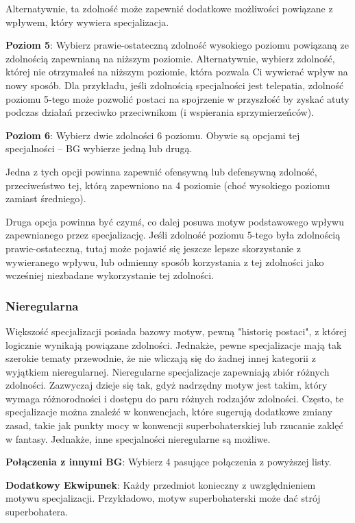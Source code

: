 Alternatywnie, ta zdolność może zapewnić dodatkowe możliwości powiązane z wpływem, który wywiera specjalizacja. 

\textbf{Poziom 5}: Wybierz prawie-ostateczną zdolność wysokiego poziomu powiązaną ze zdolnością zapewnianą na niższym poziomie. Alternatywnie, wybierz zdolność, której nie otrzymałeś na niższym poziomie, która pozwala Ci wywierać wpływ na nowy sposób. Dla przykładu, jeśli zdolnością specjalności jest telepatia, zdolność poziomu 5-tego może pozwolić postaci na spojrzenie w przyszłość by zyskać atuty podczas działań przeciwko przeciwnikom (i wspierania sprzymierzeńców).

\textbf{Poziom 6}: Wybierz dwie zdolności 6 poziomu. Obywie są opcjami tej specjalności – BG wybierze jedną lub drugą.

Jedna z tych opcji powinna zapewnić ofensywną lub defensywną zdolność, przeciweństwo tej, którą zapewniono na 4 poziomie (choć wysokiego poziomu zamiast średniego). 

Druga opcja powinna być czymś, co dalej posuwa motyw podstawowego wpływu zapewnianego przez specjalizację. Jeśli zdolność poziomu 5-tego była zdolnością prawie-ostateczną, tutaj może pojawić się jeszcze lepsze skorzystanie z wywieranego wpływu, lub odmienny sposób korzystania z tej zdolności jako wcześniej niezbadane wykorzystanie tej zdolności. 

\subsubsection{Nieregularna}

Większość specjalizacji posiada bazowy motyw, pewną "historię postaci", z której logicznie wynikają powiązane zdolności. Jednakże, pewne specjalizacje mają tak szerokie tematy przewodnie, że nie wliczają się do żadnej innej kategorii z wyjątkiem nieregularnej. Nieregularne specjalizacje zapewniają zbiór różnych zdolności. Zazwyczaj dzieje się tak, gdyż nadrzędny motyw jest takim, który wymaga różnorodności i dostępu do paru różnych rodzajów zdolności. Często, te specjalizacje można znaleźć w konwencjach, które sugerują dodatkowe zmiany zasad, takie jak punkty mocy w konwencji superbohaterskiej lub rzucanie zaklęć w fantasy. Jednakże, inne specjalności nieregularne są możliwe.

\textbf{Połączenia z innymi BG}: Wybierz 4 pasujące połączenia z powyższej listy.

\textbf{Dodatkowy Ekwipunek}: Każdy przedmiot konieczny z uwzględnieniem motywu specjalizacji. Przykładowo, motyw superbohaterski może dać strój superbohatera.

